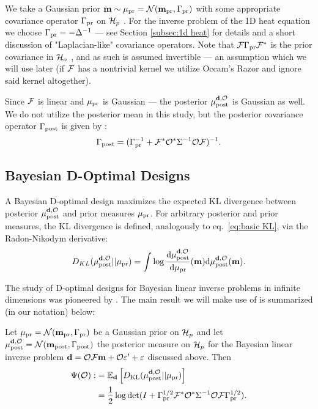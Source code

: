 We take a Gaussian prior \(\mathbf{m} \sim \mu_{\textup{pr}} = \mathcal{N}(\mathbf{m}_{\textup{pr}}
,\Gamma_{\textup{pr}})\) with some appropriate covariance operator \(\Gamma_{\textup{pr}}\) on
\(\mathcal{H}_p\) \cite{Stuart10}. For the inverse problem of the 1D heat
equation we choose $\Gamma_{\textup{pr}} = -\Delta^{-1}$ --- see Section
\ref{subsec:1d heat} for details and a short discussion of
"Laplacian-like" covariance operators. Note that \(\mathcal{F} \Gamma_{\textup{pr}}
\mathcal{F}^*\) is the prior covariance in \(\mathcal{H}_o\) \cite{Stuart10}, and as
such is assumed invertible --- an assumption which we will use later
(if \(\mathcal{F}\) has a nontrivial kernel we utilize Occam's Razor and
ignore said kernel altogether).

Since $\mathcal{F}$ is linear and $\mu_{\textup{pr}}$ is Gaussian --- the posterior
\(\mu_{\textup{post}}^{\mathbf{d}, \mathcal{O}}\) is Gaussian as well. We do not utilize the posterior mean in
this study, but the posterior covariance operator $\Gamma_{\textup{post}}$ is given
by \cite{Stuart10}:
\begin{align}\label{eq:postcov}
  \postcov = (\prcov^{-1} + \fwd^* \obs^* \Sigma^{-1} \obs \fwd
  )^{-1}.
\end{align}

\subsection{Bayesian D-Optimal Designs}\label{subsec:D optimal design} 
A Bayesian D-optimal design maximizes the expected KL divergence
between posterior \(\mu_{\textup{post}}^{\mathbf{d}, \mathcal{O}}\) and prior measures \(\mu_{\textup{pr}}\). For arbitrary
posterior and prior measures, the KL divergence is defined,
analogously to eq.~\ref{eq:basic KL}, via the Radon-Nikodym
derivative:
\begin{equation*}
  D_{KL}(\post||\pr) = \int \log \frac{\der \post}{\der \pr}(\param) \der \post(\param).
\end{equation*}

The study of D-optimal designs for Bayesian linear inverse problems in
infinite dimensions was pioneered by \cite{AlexanderianGloorGhattas14,
  alexanderian2018efficient}. The main result we will make use of is
summarized (in our notation) below:

\begin{theorem}\label{thm:d optimality}
  Let \(\mu_{\textup{pr}} = \mathcal{N}(\mathbf{m}_{\textup{pr}},\Gamma_{\textup{pr}})\) be a Gaussian prior on \(\mathcal{H}_p\)
  and let \(\mu_{\textup{post}}^{\mathbf{d}, \mathcal{O}} = \mathcal{N}(\mathbf{m}_{\textup{post}},\Gamma_{\textup{post}})\) the posterior measure
  on \(\mathcal{H}_p\) for the Bayesian linear inverse problem \(\mathbf{d} = \mathcal{O}
  \mathcal{F}\mathbf{m} + \mathcal{O} \varepsilon' + \varepsilon\) discussed above. Then
  \begin{align}\label{eq:objective}
    \begin{split}
      \tar( \obs) :&= \mathbb{E}_{\data}\left [ D_{\text{KL}} (\post || \pr ) \right ] \\
      &= \frac12 \log \det 
      ( I + \prcov^{1/2}  \fwd ^* \obs^* \Sigma^{-1} \obs \fwd \prcov^{1/2}).
    \end{split}
  \end{align}
\end{theorem}

